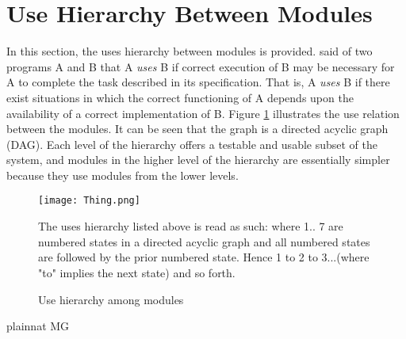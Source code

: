 \documentclass[12pt, titlepage]{article}
\newcommand{\rev}[1]{\textcolor{RevisionColour}{#1}}
\begin{document}
\section{Use Hierarchy Between Modules} \label{SecUse}

In this section, the uses hierarchy between modules is
provided. \citet{Parnas1978} said of two programs A and B that A {\em uses} B if
correct execution of B may be necessary for A to complete the task described in
its specification. That is, A {\em uses} B if there exist situations in which
the correct functioning of A depends upon the availability of a correct
implementation of B.  Figure \ref{FigUH} illustrates the use relation between
the modules. It can be seen that the graph is a directed acyclic graph
(DAG). Each level of the hierarchy offers a testable and usable subset of the
system, and modules in the higher level of the hierarchy are essentially simpler
because they use modules from the lower levels.

\begin{figure}[H]
\centering
\texttt{[image: Thing.png]}
\caption{Use hierarchy among modules}
\rev{The uses hierarchy listed above is read as such: where 1.. 7 are numbered states in a directed acyclic graph and all numbered states are followed by the prior numbered state. Hence 1 to 2 to 3...(where "to" implies the next state) and so forth. }
\label{FigUH}
\end{figure}


 {plainnat}
 {MG}
\end{document}
